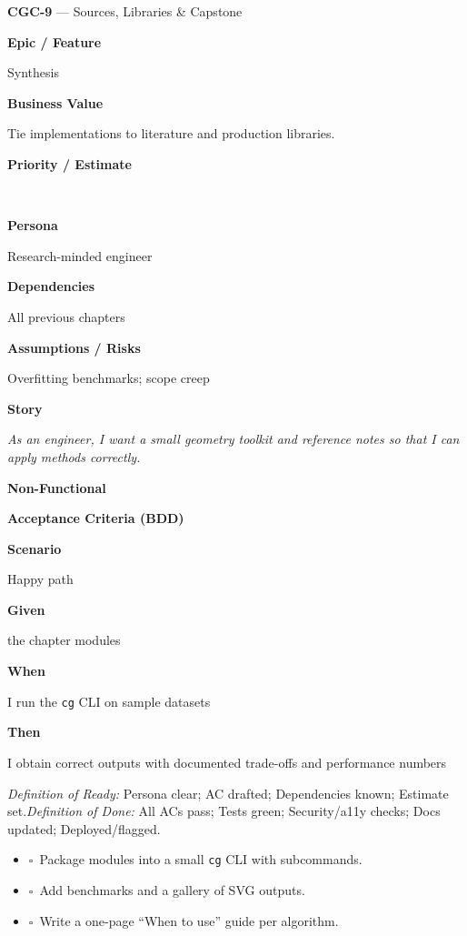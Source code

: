 \documentclass[11pt,a4paper]{article}
\newcommand{\MetaRow}[2]{%
  \noindent\begin{minipage}[t]{0.24\linewidth}\raggedleft\bfseries #1\end{minipage}%
  \hspace{0.8em}%
  \begin{minipage}[t]{0.72\linewidth}\raggedright #2\end{minipage}\par\vspace{0.3em}}
\newcommand{\CBox}{\(\square\)}
\newcommand{\BDDRow}[2]{\MetaRow{#1}{#2}}
\newenvironment{BDD}{\par\medskip}{\par\medskip}
\newcommand{\StoryTitle}[2]{\textbf{#1} --- #2}
\newcommand{\DoR}{\textit{Definition of Ready:} Persona clear; AC drafted; Dependencies known; Estimate set.}
\newcommand{\DoD}{\textit{Definition of Done:} All ACs pass; Tests green; Security/a11y checks; Docs updated; Deployed/flagged.}
\begin{document}
\begin{StoryCard}{\StoryTitle{CGC-9}{Sources, Libraries \& Capstone}}
\MetaRow{Epic / Feature}{Synthesis}
\MetaRow{Business Value}{Tie implementations to literature and production libraries.}
\MetaRow{Priority / Estimate}{\ \ \Badge{SP: 3}}
\MetaRow{Persona}{Research-minded engineer}
\MetaRow{Dependencies}{All previous chapters}
\MetaRow{Assumptions / Risks}{Overfitting benchmarks; scope creep}
\MetaRow{Story}{\emph{As an engineer, I want a small geometry toolkit and reference notes so that I can apply methods correctly.}}

\medskip
\noindent\textbf{Non-Functional}\quad
{}\ \ 

\medskip
\noindent\textbf{Acceptance Criteria (BDD)}
\begin{BDD}
\BDDRow{Scenario}{Happy path}
\BDDRow{Given}{the chapter modules}
\BDDRow{When}{I run the \texttt{cg} CLI on sample datasets}
\BDDRow{Then}{I obtain correct outputs with documented trade-offs and performance numbers}
\end{BDD}

\medskip
{\footnotesize \DoR\quad\textbullet\quad \DoD}
\end{StoryCard}

\begin{TaskBox}
\begin{itemize}
  \item \CBox\ Package modules into a small \texttt{cg} CLI with subcommands.
  \item \CBox\ Add benchmarks and a gallery of SVG outputs.
  \item \CBox\ Write a one-page ``When to use'' guide per algorithm.
\end{itemize}
\end{TaskBox}
\end{document}
